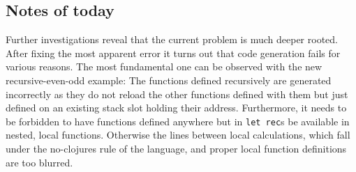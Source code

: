 \documentclass[12pt, article]{article}
\begin{document}
\subsection{Notes of today}

Further investigations reveal that the current problem is much deeper
rooted.
After fixing the most apparent error it turns out that code generation
fails for various reasons.
The most fundamental one can be observed with the new
recursive-even-odd example:
The functions defined recursively are generated incorrectly as they do
not reload the other functions defined with them but just defined on
an existing stack slot holding their address.
Furthermore, it needs to be forbidden to have functions defined
anywhere but in \texttt{let rec}s be available in nested, local
functions.
Otherwise the lines between local calculations, which fall under the
no-clojures rule of the language, and proper local function
definitions are too blurred.
\end{document}
